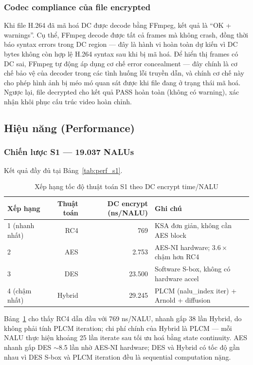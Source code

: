 \subsubsection{Codec compliance của file encrypted}

Khi file H.264 đã mã hoá DC được decode bằng FFmpeg, kết quả là ``OK + warnings''. Cụ thể, FFmpeg decode được tất cả frames mà không crash, đồng thời báo syntax errors trong DC region --- đây là hành vi hoàn toàn dự kiến vì DC bytes không còn hợp lệ H.264 syntax sau khi bị mã hoá. Để hiển thị frames có DC sai, FFmpeg tự động áp dụng cơ chế error concealment --- đây chính là cơ chế bảo vệ của decoder trong các tình huống lỗi truyền dẫn, và chính cơ chế này cho phép hình ảnh bị méo mó quan sát được khi file đang ở trạng thái mã hoá. Ngược lại, file decrypted cho kết quả PASS hoàn toàn (không có warning), xác nhận khôi phục cấu trúc video hoàn chỉnh.

\subsection{Hiệu năng (Performance)}

\subsubsection{Chiến lược S1 --- 19.037 NALUs}

Kết quả đầy đủ tại Bảng~\ref{tab:perf_s1}.

\begin{table}[ht]
\centering
\caption{Xếp hạng tốc độ thuật toán S1 theo DC encrypt time/NALU}
\label{tab:speed_rank_s1}
\begin{tabular}{|l|r|r|l|}
\hline
\textbf{Xếp hạng} & \textbf{Thuật toán} & \textbf{DC encrypt (ns/NALU)} & \textbf{Ghi chú} \\
\hline
1 (nhanh nhất) & RC4    & 769    & KSA đơn giản, không cần AES block \\
\hline
2              & AES    & 2.753  & AES-NI hardware; $3.6\times$ chậm hơn RC4 \\
\hline
3              & DES    & 23.500 & Software S-box, không có hardware accel \\
\hline
4 (chậm nhất) & Hybrid & 29.245 & PLCM (nalu\_index iter) + Arnold + diffusion \\
\hline
\end{tabular}
\end{table}

Bảng~\ref{tab:speed_rank_s1} cho thấy RC4 dẫn đầu với 769 ns/NALU, nhanh gấp 38 lần Hybrid, do không phải tính PLCM iteration; chi phí chính của Hybrid là PLCM --- mỗi NALU thực hiện khoảng 25 lần iterate sau tối ưu hoá bằng state continuity. AES nhanh gấp DES $\sim$8.5 lần nhờ AES-NI hardware; DES và Hybrid có tốc độ gần nhau vì DES S-box và PLCM iteration đều là sequential computation nặng.


